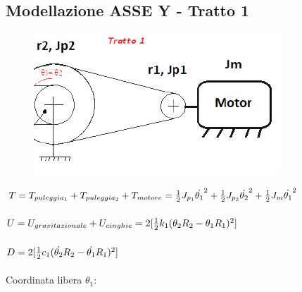 \documentclass{article}
\begin{document}
\subsection{Modellazione ASSE Y - Tratto 1} 
\begin{figure}[H]
\centering
\includegraphics[width=.6\textwidth]{./assey/tratto1.png}
\end{figure}
$T = T_{puleggia_1} + T_{puleggia_2}+ T_{motore}
= {1 \over 2}J_{p_1}\dot{\theta_{1}}^{2}+ {1 \over 2}J_{p_2}\dot{\theta_{2}}^{2} + {1 \over 2}J_{m}\dot{\theta_{1}}^{2}$
\\
\\
$U = U_{gravitazionale} + U_{cinghie}
=  2[ {1 \over 2}k _{1}(\theta_{2}R_{2}-\theta_{1}R_{1})^{2} ]$
\\
\\
$D = 2[ {1 \over 2}c _{1}(\dot{\theta_{2}} R_{2}-\dot{\theta_{1}}R_{1})^{2} ]$
\\
\\
Coordinata libera $\theta_{1}$:
\\
\\
\end{document}
